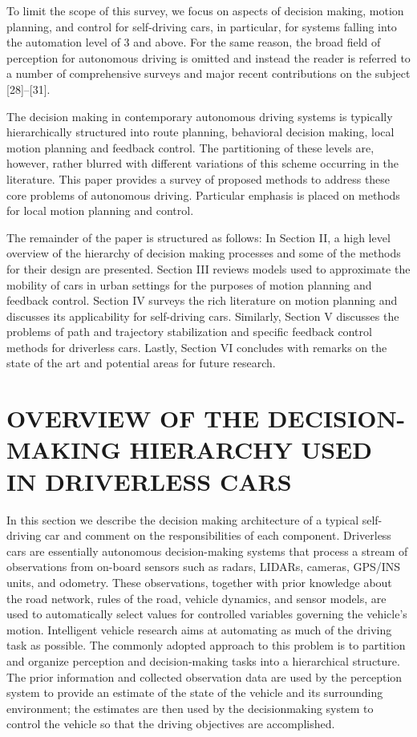 \documentclass[a4paper,10pt]{article}
\begin{document}
To limit the scope of this survey, we focus on aspects of decision making, motion planning, and control for self-driving cars, in particular, for systems falling into the automation level of 3 and above. For the same reason, the broad field of perception for autonomous driving is omitted and instead the reader is referred to a number of comprehensive surveys and major recent contributions on the subject [28]–[31].

The decision making in contemporary autonomous driving systems is typically hierarchically structured into route planning, behavioral decision making, local motion planning and feedback control. The partitioning of these levels are, however, rather blurred with different variations of this scheme occurring in the literature. This paper provides a survey of proposed methods to address these core problems of autonomous driving. Particular emphasis is placed on methods for local motion planning and control.

The remainder of the paper is structured as follows: In Section II, a high level overview of the hierarchy of decision making processes and some of the methods for their design are presented. Section III reviews models used to approximate the mobility of cars in urban settings for the purposes of motion planning and feedback control. Section IV surveys the rich literature on motion planning and discusses its applicability for self-driving cars. Similarly, Section V discusses the problems of path and trajectory stabilization and specific feedback control methods for driverless cars. Lastly, Section VI concludes with remarks on the state of the art and potential areas for future research.

\section{OVERVIEW OF THE DECISION-MAKING HIERARCHY
USED IN DRIVERLESS CARS}

In this section we describe the decision making architecture of a typical self-driving car and comment on the responsibilities of each component. Driverless cars are essentially autonomous decision-making systems that process a stream of observations from on-board sensors such as radars, LIDARs, cameras, GPS/INS units, and odometry. These observations, together with prior knowledge about the road network, rules of the road, vehicle dynamics, and sensor models, are used to automatically select values for controlled variables governing the vehicle’s motion. Intelligent vehicle research aims at automating as much of the driving task as possible. The commonly adopted approach to this problem is to partition and organize perception and decision-making tasks into a hierarchical structure. The prior information and collected observation data are used by the perception system to provide an estimate of the state of the vehicle and its surrounding environment; the estimates are then used by the decisionmaking system to control the vehicle so that the driving objectives are accomplished.
\end{document}
